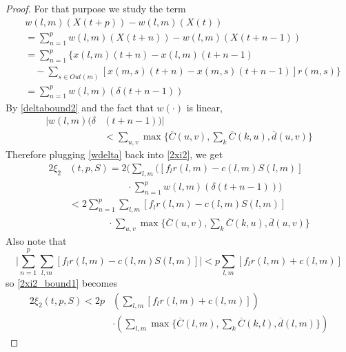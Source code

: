 \begin{proof}
%
For that purpose we study the term
\begin{align} \nonumber
&w(l,m)(X(t+p))   -  w(l,m)(X(t)) \\ \nonumber
& = \sum_{n=1}^{p} w(l,m)(X(t+n)) - w(l,m)(X(t + n - 1)) \\ \nonumber
&= \sum_{n=1}^{p} \Big\{ x(l,m)(t + n) - x(l,m)(t + n - 1)   \\ \nonumber 
&  \quad - \sum_{s \in Out(m)}[ x(m,s)(t + n) - x(m,s)(t + n - 1) ]r(m,s)  \Big\} \\ 
&= \sum_{n=1}^{p}  w(l,m)( \delta(t + n - 1)) 
\end{align}
{\color{red}
By \eqref{deltabound2} and the fact that $w(\cdot)$ is linear,  }
\begin{align} \nonumber
\vert w(l,m)(\delta&(t + n -1)) \vert \\  \label{wdelta}
&< \sum_{u,v} \max\Big\{  \overline{C}(u,v), \sum_{k}\overline{C}(k,u), \overline{d}(u,v)\Big\}
\end{align}
Therefore plugging \eqref{wdelta} back into \eqref{2xi2}, we get
\begin{align} \nonumber 
2\xi_2&(t,p,S) = 2\bigg( \sum_{l,m}\big([f_{l}r(l,m) - c(l,m)S(l,m)] \\  \nonumber
&\qquad \qquad \qquad \cdot \sum_{n=1}^{p}  w(l,m)( \delta(t + n - 1))\bigg)  \\ \nonumber
&< 2 \sum_{n=1}^{p}  \sum_{l,m}[f_{l}r(l,m) - c(l,m)S(l,m)] \\ 
&\qquad \qquad \cdot\sum_{u,v} \max\Big\{  \overline{C}(u,v), \sum_{k}\overline{C}(k,u), \overline{d}(u,v)\Big\} \label{2xi2_bound1}
\end{align}
Also note that 
\begin{equation}
\vert \sum_{n=1}^{p}  \sum_{l,m}[f_{l}r(l,m) - c(l,m)S(l,m)] \vert < p \sum_{l,m}[f_{l}r(l,m) + c(l,m)]
\end{equation}
so \eqref{2xi2_bound1} becomes
\begin{align} \label{2xi2_bound2}
2\xi_2(t,p,S) < 2 p &\left( \sum_{l,m}[f_{l}r(l,m) + c(l,m)]\right)\\ \nonumber
&\cdot\left( \sum_{l,m} \max\Big\{  \overline{C}(l,m), \sum_{k}\overline{C}(k,l), \overline{d}(l,m)\Big\} \right)
\end{align}


\end{proof}
